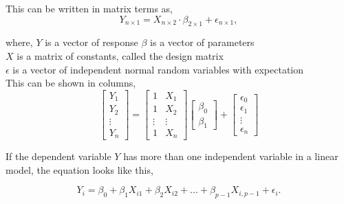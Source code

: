 	This can be written in matrix terms as, 
	$$Y_{n \times 1}=X_{n \times 2} \cdot \beta_{2 \times 1} + \epsilon_{n \times 1},$$	
	
	where, \newline
	\textbf{$Y$} is a vector of response \newline
	\textbf{$\beta$} is a vector of parameters \\
	\textbf{$X$} is a matrix of constants, called the design matrix\\
	\textbf{$\epsilon$} is a vector of independent normal random variables with expectation\\
	
	This can be shown in columns,
	$$
	\left[
	\begin{array}{c}
		Y_1 \\ 
		Y_2 \\ 
		\vdots \\
		Y_n 
	\end{array}
	\right]
	=
	\left[
	\begin{array}{cc}
		1 & X_1 \\ 
		1 & X_2 \\ 
		\vdots & \vdots \\
		1 & X_n
	\end{array}
	\right]
	\left[
	\begin{array}{c}
		\beta_0 \\ 
		\beta_1 
	\end{array}
	\right]
	+
	\left[
	\begin{array}{c}
		\epsilon_0 \\ 
		\epsilon_1 \\
		\vdots \\
		\epsilon_n 
	\end{array}
	\right]
	$$
	
	If the dependent variable $Y$ has more than one independent variable in a linear model, the equation looks like this, 
	
	$$Y_i = \beta_0 + \beta_1 X_{i1} + \beta_2 X_{i2} + ... + \beta_{p-1} X_{i, p-1} + \epsilon_i.$$
	
